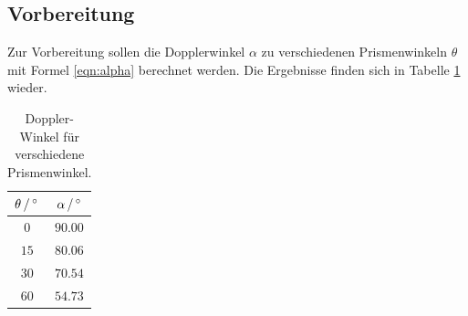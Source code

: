 \subsection{Vorbereitung}
Zur Vorbereitung sollen die Dopplerwinkel $\alpha$ zu verschiedenen Prismenwinkeln
$\theta$
mit Formel \eqref{eqn:alpha} berechnet werden. Die Ergebnisse finden sich in
Tabelle \ref{tab:alpha} wieder.
\begin{table}
  \centering
  \begin{tabular}{c|c}
    \toprule
    $\theta\,/\,\si{\degree}$ & $\alpha\,/\,\si{\degree}$ \\
    \midrule
    $ 0$ & $90.00$ \\
    $15$ & $80.06$ \\
    $30$ & $70.54$ \\
    $60$ & $54.73$ \\
    \bottomrule
  \end{tabular}
  \caption{Doppler-Winkel für verschiedene Prismenwinkel.}
  \label{tab:alpha}
\end{table}
